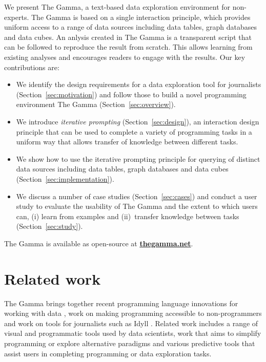 \documentclass{sigchi}
\begin{document}
We present The Gamma, a text-based data exploration environment for non-experts. The Gamma
is based on a single interaction principle, which provides uniform
access to a range of data sources including data tables, graph databases and data cubes.
An anlysis created in The Gamma is a transparent script that can be followed to reproduce the
result from scratch. This allows learning from existing analyses and encourages readers
to engage with the results. Our key contributions are:

\begin{itemize}
\item We identify the design requirements for a data exploration tool for journalists
  (Section~\ref{sec:motivation}) and follow those to build a novel programming environment
  The Gamma (Section~\ref{sec:overview}).

\item We introduce \emph{iterative prompting} (Section~\ref{sec:design}),
  an interaction design principle that can be used to complete a variety of programming
  tasks in a uniform way that allows transfer of knowledge between different tasks.

\item We show how to use the iterative prompting principle for querying of distinct data
  sources including data tables, graph databases and data cubes (Section~\ref{sec:implementation}).

\item We discuss a number of case studies (Section~\ref{sec:cases}) and
  conduct a user study to evaluate the usability of The Gamma and the extent to which users can,
  (i) learn from examples and (ii)~transfer knowledge between tasks (Section~\ref{sec:study}).
\end{itemize}

The Gamma is available as open-source at \href{http://thegamma.net}{\small\bf\ttfamily thegamma.net}.

\section{Related work}

The Gamma brings together recent programming language innovations for working with data
\cite{inforich}, work on making programming accessible to non-programmers \cite{enduser,smallmatter}
and work on tools for journalists such as Idyll \cite{idyll}. Related work includes a range of
visual and programmatic tools used by data scientists, work that aims to simplify programming
or explore alternative paradigms and various predictive tools that assist users in completing
programming or data exploration tasks.
\end{document}
